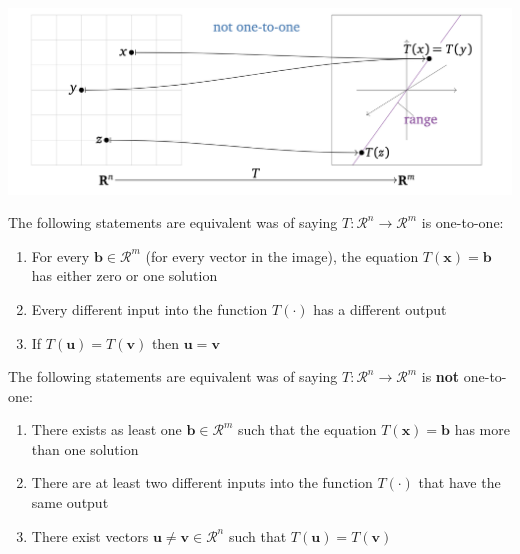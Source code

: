 \documentclass[
]{book}
\theoremstyle{definition}
\theoremstyle{definition}
\theoremstyle{definition}
\theoremstyle{definition}
\theoremstyle{remark}
\begin{document}
\includegraphics[width=1\linewidth]{images/not-one-to-one}

The following statements are equivalent was of saying \(T:\mathcal{R}^n \rightarrow \mathcal{R}^m\) is one-to-one:

\begin{enumerate}
\def\labelenumi{\alph{enumi})}
\item
  For every \(\mathbf{b} \in \mathcal{R}^m\) (for every vector in the image), the equation \(T(\mathbf{x}) = \mathbf{b}\) has either zero or one solution
\item
  Every different input into the function \(T(\cdot)\) has a different output
\item
  If \(T(\mathbf{u}) = T(\mathbf{v})\) then \(\mathbf{u} = \mathbf{v}\)
\end{enumerate}

The following statements are equivalent was of saying \(T:\mathcal{R}^n \rightarrow \mathcal{R}^m\) is \textbf{not} one-to-one:

\begin{enumerate}
\def\labelenumi{\alph{enumi})}
\item
  There exists as least one \(\mathbf{b} \in \mathcal{R}^m\) such that the equation \(T(\mathbf{x}) = \mathbf{b}\) has more than one solution
\item
  There are at least two different inputs into the function \(T(\cdot)\) that have the same output
\item
  There exist vectors \(\mathbf{u} \neq \mathbf{v} \in \mathcal{R}^n\) such that \(T(\mathbf{u}) = T(\mathbf{v})\)
\end{enumerate}
\end{document}
